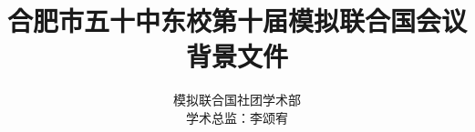 \documentclass{article}
\title{合肥市五十中东校第十届模拟联合国会议\\\huge 背景文件}
\author{模拟联合国社团学术部 \\ 学术总监：李颂宥}
\begin{document}
    \centering
    \maketitle
    \clearpage
    \tableofcontents
\end{document}
